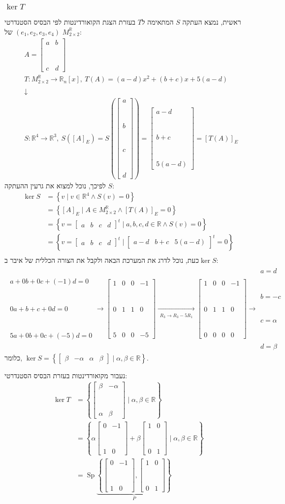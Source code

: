\documentclass[11pt, oneside]{article}
\newcommand{\br}{\\\\\\\\\\\\\\}
\newcommand{\opr}[1]{\xrightarrow[\text{#1}]{}}
\newcommand{\oprm}[1]{\underset{\substack{#1}}{\longrightarrow}}
\newcommand{\mR}{\mathbb{R}}
\DeclareMathOperator{\Sp}{Sp}
\newcommand{\fiv}[4]{\begin{bmatrix}#1 \br #2 \br #3 \br #4\end{bmatrix}}
\newcommand{\fir}[4]{\begin{bmatrix}#1 & #2 & #3 & #4\end{bmatrix}}
\newcommand{\fim}[4]{\begin{bmatrix}#1 & #2 \br #3 & #4\end{bmatrix}}
\newcommand{\tiv}[3]{\begin{bmatrix}#1 \br #2 \br #3\end{bmatrix}}
\newcommand{\tir}[3]{\begin{bmatrix}#1 & #2 & #3\end{bmatrix}}
\begin{document}
\subsubsection{$\ker T$}
ראשית, נמצא העתקה $S$ המתאימה ל$T$ בעזרת הצגת הקואורדינטות לפי הבסיס הסטנדרטי $(e_1, e_2, e_3, e_4)$ של $M^\mR_{2 \times 2}$:
\begin{eqnarray*}
& A = \begin{bmatrix}
a & b\br
c & d
\end{bmatrix}\\
& T: M^\mR_{2 \times 2} \opr{} \mR_n[x],\ T(A) = (a - d)x^2 + (b + c)x + 5(a - d)\\
& \downarrow\\
& S: \mR^4 \opr{} \mR^3,\ S([A]_E) = S\left(\fiv{a}{b}{c}{d}\right) = \tiv{a - d}{b + c}{5(a - d)} = [T(A)]_E
\end{eqnarray*}
לפיכך, נוכל למצוא את גרעין ההעתקה $S$:
\begin{align*}
\ker S
& = \left\{v \mid v \in \mR^4 \land S(v) = 0\right\}\\
& = \left\{[A]_E \mid A \in M^\mR_{2 \times 2} \land [T(A)]_E = 0\right\}\\
& = \left\{v = \fir{a}{b}{c}{d}^t \mid a, b, c, d \in \mR \land S(v) = 0\right\}\\
& = \left\{v = \fir{a}{b}{c}{d}^t \mid \tir{a - d}{b + c}{5(a - d)}^t = 0\right\}\\
\end{align*}
כעת, נוכל לדרג את המערכת הבאה ולקבל את הצורה הכללית של איבר ב$\ker S$:
\begin{align*}
\begin{matrix}
a + 0b + 0c + (-1)d = 0\br
0a + b + c + 0d = 0\br
5a + 0b + 0c + (-5)d = 0
\end{matrix}
\opr{}
\begin{bmatrix}
1 & 0 & 0 & -1\br
0 & 1 & 1 & 0\br
5 & 0 & 0 & -5
\end{bmatrix}
\oprm{%
R_3 \opr{} R_3 - 5R_1
}
\begin{bmatrix}
1 & 0 & 0 & -1\br
0 & 1 & 1 & 0\br
0 & 0 & 0 & 0
\end{bmatrix}
\opr{}
\begin{matrix}
a = d\br
b = -c\br
c = \alpha\br
d = \beta
\end{matrix}
\end{align*}
כלומר, $\ker S = \left\{\fir{\beta}{-\alpha}{\alpha}{\beta} \mid \alpha, \beta \in \mR\right\}$.

נעבור מקואורדינטות בעזרת הבסיס הסטנדרטי:
\begin{align*}
\ker T
& = \left\{\fim{\beta}{-\alpha}{\alpha}{\beta} \mid \alpha, \beta \in \mR\right\}\\
& = \left\{\alpha\fim{0}{-1}{1}{0} + \beta\fim{1}{0}{0}{1} \mid \alpha, \beta \in \mR \right\}\\
& = \Sp\underbrace{\left\{\fim{0}{-1}{1}{0}, \fim{1}{0}{0}{1}\right\}}_P
\end{align*}
\end{document}
